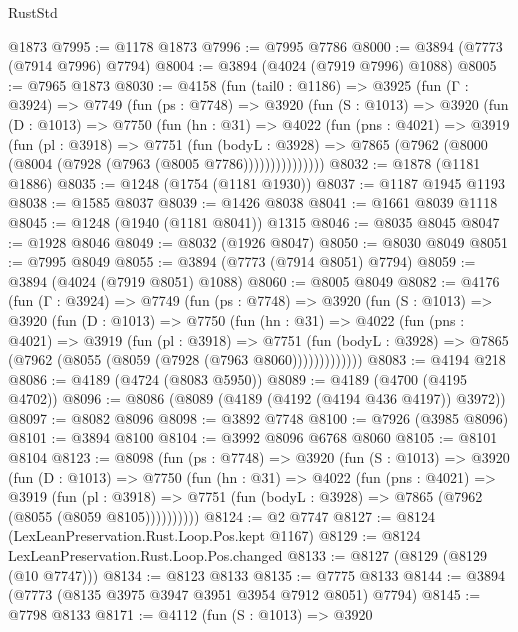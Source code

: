 \begin{lexlean}{RustStd}
\begin{coremodule}
    @1873
@7995 := @1178 @1873
@7996 := @7995 @7786
@8000 := @3894 (@7773 (@7914 @7996) @7794)
@8004 := @3894 (@4024 (@7919 @7996) @1088)
@8005 := @7965 @1873
@8030 := @4158
    (fun (tail0 : @1186) =>
    @3925
      (fun (Γ : @3924) =>
      @7749
        (fun (ps : @7748) =>
        @3920
          (fun (S : @1013) =>
          @3920
            (fun (D : @1013) =>
            @7750
              (fun (hn : @31) =>
              @4022
                (fun (pns : @4021) =>
                @3919
                  (fun (pl : @3918) =>
                  @7751
                    (fun (bodyL : @3928) =>
                    @7865 (@7962 (@8000 (@8004 (@7928 (@7963 (@8005 @7786)))))))))))))))
@8032 := @1878 (@1181 @1886)
@8035 := @1248 (@1754 (@1181 @1930))
@8037 := @1187 @1945 @1193
@8038 := @1585 @8037
@8039 := @1426 @8038
@8041 := @1661 @8039 @1118
@8045 := @1248 (@1940 (@1181 @8041)) @1315
@8046 := @8035 @8045
@8047 := @1928 @8046
@8049 := @8032 (@1926 @8047)
@8050 := @8030 @8049
@8051 := @7995 @8049
@8055 := @3894 (@7773 (@7914 @8051) @7794)
@8059 := @3894 (@4024 (@7919 @8051) @1088)
@8060 := @8005 @8049
@8082 := @4176
    (fun (Γ : @3924) =>
    @7749
      (fun (ps : @7748) =>
      @3920
        (fun (S : @1013) =>
        @3920
          (fun (D : @1013) =>
          @7750
            (fun (hn : @31) =>
            @4022
              (fun (pns : @4021) =>
              @3919
                (fun (pl : @3918) =>
                @7751
                  (fun (bodyL : @3928) =>
                  @7865 (@7962 (@8055 (@8059 (@7928 (@7963 @8060)))))))))))))
@8083 := @4194 @218
@8086 := @4189 (@4724 (@8083 @5950))
@8089 := @4189 (@4700 (@4195 @4702))
@8096 := @8086 (@8089 (@4189 (@4192 (@4194 @436 @4197)) @3972))
@8097 := @8082 @8096
@8098 := @3892 @7748
@8100 := @7926 (@3985 @8096)
@8101 := @3894 @8100
@8104 := @3992 @8096 @6768 @8060
@8105 := @8101 @8104
@8123 := @8098
    (fun (ps : @7748) =>
    @3920
      (fun (S : @1013) =>
      @3920
        (fun (D : @1013) =>
        @7750
          (fun (hn : @31) =>
          @4022
            (fun (pns : @4021) =>
            @3919
              (fun (pl : @3918) =>
              @7751 (fun (bodyL : @3928) => @7865 (@7962 (@8055 (@8059 @8105))))))))))
@8124 := @2 @7747
@8127 := @8124 (LexLeanPreservation.Rust.Loop.Pos.kept @1167)
@8129 := @8124 LexLeanPreservation.Rust.Loop.Pos.changed
@8133 := @8127 (@8129 (@8129 (@10 @7747)))
@8134 := @8123 @8133
@8135 := @7775 @8133
@8144 := @3894 (@7773 (@8135 @3975 @3947 @3951 @3954 @7912 @8051) @7794)
@8145 := @7798 @8133
@8171 := @4112
    (fun (S : @1013) =>
    @3920

\end{coremodule}
\end{lexlean}
